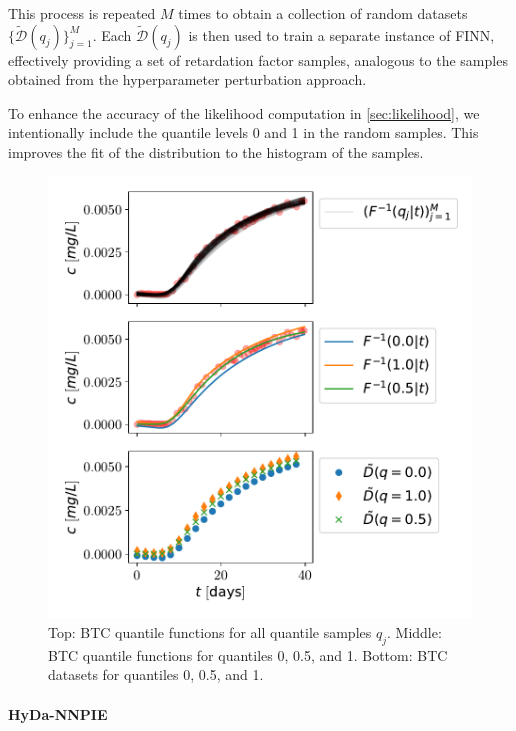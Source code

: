This process is repeated $M$ times to obtain a collection of random datasets $\{\tilde{\mathcal{D}}(q_j)\}_{j=1}^M$. Each $\tilde{\mathcal{D}}(q_j)$ is then used to train a separate instance of FINN, effectively providing a set of retardation factor samples, analogous to the samples obtained from the hyperparameter perturbation approach.

To enhance the accuracy of the likelihood computation in \cref{sec:likelihood}, we intentionally include the quantile levels 0 and 1 in the random samples. This improves the fit of the distribution to the histogram of the samples.

\begin{figure}[h]
    \centering
    \includegraphics{figs/btc_dataspan_quantiles.pdf}
    \caption{Top: BTC quantile functions for all quantile samples $q_j$. Middle: BTC quantile functions for quantiles 0, 0.5, and 1. Bottom: BTC datasets for quantiles 0, 0.5, and 1.}
    \label{fig:btc_dataspan_quantiles}
\end{figure}



\paragraph{HyDa-NNPIE}

